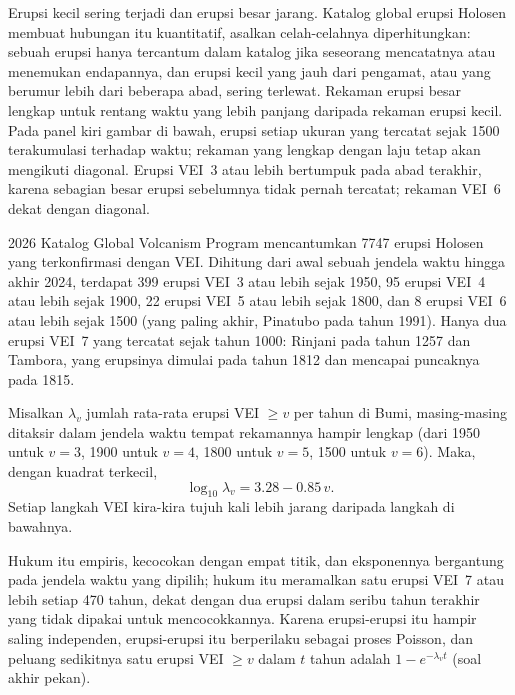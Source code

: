 Erupsi kecil sering terjadi dan erupsi besar jarang. Katalog global erupsi
Holosen membuat hubungan itu kuantitatif, asalkan celah-celahnya
diperhitungkan: sebuah erupsi hanya tercantum dalam katalog jika seseorang mencatatnya atau menemukan
endapannya, dan erupsi kecil yang jauh dari pengamat, atau yang berumur lebih dari beberapa abad,
sering terlewat. Rekaman erupsi besar lengkap untuk rentang waktu yang lebih panjang daripada
rekaman erupsi kecil. Pada panel kiri gambar di bawah, erupsi setiap
ukuran yang tercatat sejak 1500 terakumulasi terhadap waktu; rekaman yang lengkap dengan laju
tetap akan mengikuti diagonal. Erupsi VEI~3 atau lebih bertumpuk pada abad
terakhir, karena sebagian besar erupsi sebelumnya tidak pernah tercatat; rekaman VEI~6
dekat dengan diagonal.

\begin{dated}{2026}
Katalog Global Volcanism Program mencantumkan \num{7747} erupsi Holosen yang terkonfirmasi
dengan VEI. Dihitung dari awal sebuah jendela waktu hingga akhir 2024, terdapat
399 erupsi VEI~3 atau lebih sejak 1950, 95 erupsi VEI~4 atau lebih sejak 1900,
22 erupsi VEI~5 atau lebih sejak 1800, dan 8 erupsi VEI~6 atau lebih sejak 1500 (yang paling
akhir, Pinatubo pada tahun 1991). Hanya dua erupsi VEI~7 yang tercatat sejak tahun
1000: Rinjani pada tahun 1257 dan Tambora, yang erupsinya dimulai pada tahun 1812 dan mencapai puncaknya pada
1815.
\end{dated}

\begin{proposition}\label{prop:b2:eruptive-styles:frequency}
Misalkan $\lambda_v$ jumlah rata-rata erupsi VEI $\ge v$ per tahun di Bumi,
masing-masing ditaksir dalam jendela waktu tempat rekamannya hampir lengkap (dari 1950
untuk $v = 3$, 1900 untuk $v = 4$, 1800 untuk $v = 5$, 1500 untuk $v = 6$). Maka, dengan kuadrat
terkecil,
\[
\log_{10}\lambda_v = 3.28 - 0.85\,v .
\]
Setiap langkah VEI kira-kira tujuh kali lebih jarang daripada langkah di bawahnya.
\end{proposition}

Hukum itu empiris, kecocokan dengan empat titik, dan eksponennya bergantung pada
jendela waktu yang dipilih; hukum itu meramalkan satu erupsi VEI~7 atau lebih setiap \num{470} tahun,
dekat dengan dua erupsi dalam seribu tahun terakhir yang tidak dipakai untuk mencocokkannya. Karena
erupsi-erupsi itu hampir saling independen, erupsi-erupsi itu berperilaku sebagai proses
Poisson, dan peluang sedikitnya satu erupsi VEI $\ge v$ dalam $t$ tahun
adalah $1 - e^{-\lambda_vt}$ (soal akhir pekan).

